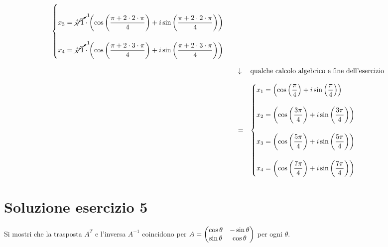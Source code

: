 \documentclass[a4paper]{article}
\makeatletter
\newenvironment{rowequmat}[1]{\left(\array{@{}#1@{}}}{\endarray\right)}
\makeatother
\begin{document}
\begin{equation*}
\begin{array}{rll}
\begin{cases}
				\\
				x_{3} = \cancelto{1}{\sqrt[4]{1}} \cdot \left(\cos\left(\dfrac{\pi + 2 \cdot 2 \cdot \pi}{4}\right) + i \sin\left(\dfrac{\pi + 2 \cdot 2 \cdot \pi}{4}\right)\right)\\
				\\
				x_{4} = \cancelto{1}{\sqrt[4]{1}} \cdot \left(\cos\left(\dfrac{\pi + 2 \cdot 3 \cdot \pi}{4}\right) + i \sin\left(\dfrac{\pi + 2 \cdot 3 \cdot \pi}{4}\right)\right)
			\end{cases} \\
			\\
			& \downarrow & \text{qualche calcolo algebrico e fine dell'esercizio} \\
			\\
			& = & \begin{cases}
				x_{1} = \left(\cos\left(\dfrac{\pi}{4}\right) + i \sin\left(\dfrac{\pi}{4}\right)\right)\\
				\\
				x_{2} = \left(\cos\left(\dfrac{3\pi}{4}\right) + i \sin\left(\dfrac{3\pi}{4}\right)\right)\\
				\\
				x_{3} = \left(\cos\left(\dfrac{5\pi}{4}\right) + i \sin\left(\dfrac{5\pi}{4}\right)\right)\\
				\\
				x_{4} = \left(\cos\left(\dfrac{7\pi}{4}\right) + i \sin\left(\dfrac{7\pi}{4}\right)\right)
			\end{cases}
		\end{array}
	\end{equation*}\newpage

	\section{Soluzione esercizio 5}
	
	Si mostri che la trasposta $A^{T}$ e l'inversa $A^{-1}$ coincidono per $A = \begin{rowequmat}{cc}
		\cos\theta & -\sin\theta \\
		\sin\theta & \cos\theta
	\end{rowequmat}$ per ogni $\theta$.\newline
\end{document}
